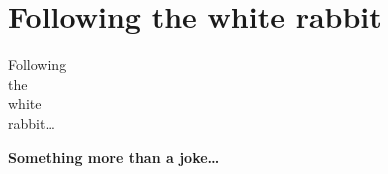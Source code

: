 
\section{Following the white rabbit}

{
\begin{frame}[plain]
    \Huge\bfseries
    \hspace{6.5cm}
    \begin{minipage}{.3\textwidth}
      Following \\
      the \\
      white \\
      rabbit\ldots
    \end{minipage}
\end{frame}
}

{
\begin{frame}[plain]
  \begin{center}
    \Huge\bfseries
    Something more than a joke\ldots
  \end{center}

  \vspace{.3cm}

  \begin{center}
  \end{center}

\end{frame}
}

{
\begin{frame}[plain]

\end{frame}
}



